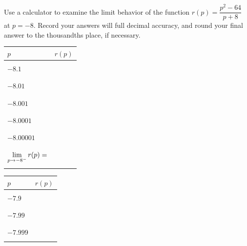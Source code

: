 \documentclass[notes]{subfiles}
\begin{document}
		\begin{ex}
			Use a calculator to examine the limit behavior of the function $r(p) = \dfrac{p^2-64}{p+8}$ at $p = -8$.  Record your answers will full decimal accuracy, and round your final answer to the thousandths place, if necessary.\\
			\begin{center}
				\begin{minipage}{.45\textwidth}
					\tabulinesep=1mm
					\begin{tabu}{|X[c]|X[1.5,c]|}\hline
						$p$ 						& $r(p)$ \\ \hline
												& \\
						$-8.1$					& \\ 
												& \\ \hline
												& \\
						$-8.01$	& \\
												& \\ \hline 
												& \\
						$-8.001$	& \\ 
												& \\ \hline
												& \\ 
						$-8.0001$	& \\ 
												& \\ \hline
												& \\
						$-8.00001$	&\\
												&\\ \hline\hline
												&\\
						$\displaystyle \lim_{p\to -8^-}r(p)  =$ & \\
												&\\ \hline
					\end{tabu}
				\end{minipage}
				\begin{minipage}{.45\textwidth}
					\tabulinesep=1mm
					\begin{tabu}{|X[c]|X[1.5,c]|}\hline
						$p$ 		& $r(p)$ \\ \hline
								& \\
						$-7.9$		& \\ 
								& \\ \hline
								& \\
						$-7.99$	& \\
								& \\ \hline 
								& \\
						$-7.999$	& \\ 
								& \\ \hline

\end{tabu}
\end{minipage}
\end{center}
\end{ex}
\end{document}
